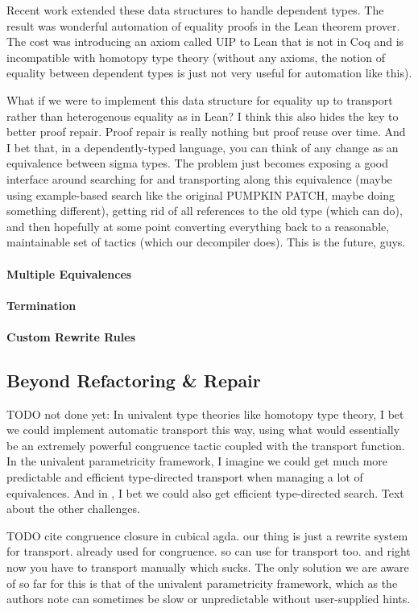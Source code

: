 Recent work extended these data structures to handle dependent types. The result was wonderful automation of equality proofs in the Lean theorem prover. The cost was introducing an axiom called UIP to Lean that is not in Coq and is incompatible with homotopy type theory (without any axioms, the notion of equality between dependent types is just not very useful for automation like this).

What if we were to implement this data structure for equality up to transport rather than heterogenous equality as in Lean?
I think this also hides the key to better proof repair. Proof repair is really nothing but proof reuse over time. And I bet that, in a dependently-typed language, you can think of any change as an equivalence between sigma types. The problem just becomes exposing a good interface around searching for and transporting along this equivalence (maybe using example-based search like the original PUMPKIN PATCH, maybe doing something different), getting rid of all references to the old type (which \toolname can do), and then hopefully at some point converting everything back to a reasonable, maintainable set of tactics (which our decompiler does). This is the future, guys.

\paragraph{Multiple Equivalences}

\paragraph{Termination}

\paragraph{Custom Rewrite Rules}

\subsection{Beyond Refactoring \& Repair}
\label{sec:beyond}

TODO not done yet: In univalent type theories like homotopy type theory, I bet we could implement automatic transport this way, using what would essentially be an extremely powerful congruence tactic coupled with the transport function. In the univalent parametricity framework, I imagine we could get much more predictable and efficient type-directed transport when managing a lot of equivalences. And in \toolname, I bet we could also get efficient type-directed search. Text about the other challenges.

TODO cite congruence closure in cubical agda. our thing is just a rewrite system for transport. already used for congruence. so can use for transport too.
and right now you have to transport manually which sucks.
The only solution we are aware of so far for this is that of the univalent parametricity framework,
which as the authors note can sometimes be slow or unpredictable without user-supplied hints.

